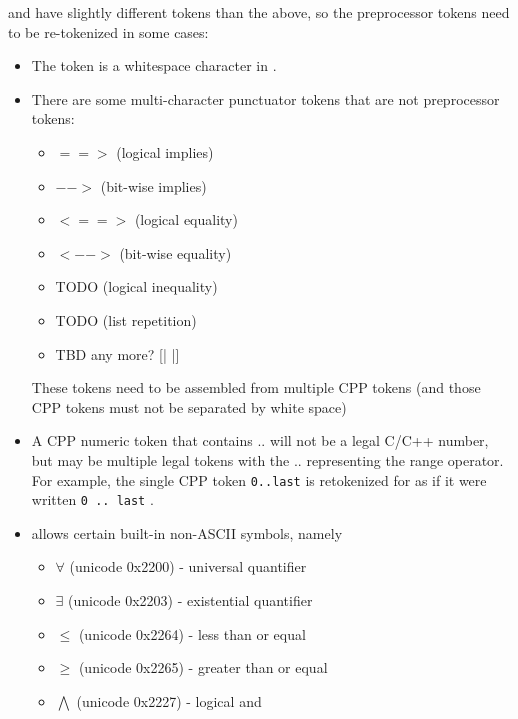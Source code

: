 \acsl and \acslpp have slightly different tokens than the above, so the preprocessor tokens need to be re-tokenized in some cases:
\begin{itemize}
	\item The \texttt{\at} token is a whitespace character in \acslb.
	\item There are some \acslb multi-character punctuator tokens that are not
	preprocessor tokens:
	\begin{itemize}
		\item[] $==>$ (logical implies)
		\item[] $-->$ (bit-wise implies)
		\item[] $<==>$ (logical equality)
		\item[] $<-->$ (bit-wise equality)
		\item[] TODO (logical inequality)
		\item[] TODO (list repetition)
		\item[] TBD any more? [| |]
	\end{itemize}
	These \acslb tokens need to be assembled from multiple CPP tokens (and those CPP tokens must not be separated by white space)
	\item A CPP numeric token that contains .. will not be a legal C/C++ number, but may be multiple legal \acslb tokens with the .. representing the range operator.  For example, the single CPP token \texttt{0..last} is retokenized for \acslb as if it were written \texttt{0 .. last} .
	\item \acslb allows certain built-in non-ASCII symbols, namely
	\begin{itemize}
		\item[] $\forall$ (unicode 0x2200) - universal quantifier
		\item[] $\exists$ (unicode 0x2203) - existential quantifier
		\item[] $\leq$ (unicode 0x2264) - less than or equal
		\item[] $\geq$ (unicode 0x2265) - greater than or equal
		\item[] $\bigwedge$ (unicode 0x2227) - logical and

\end{itemize}
\end{itemize}
